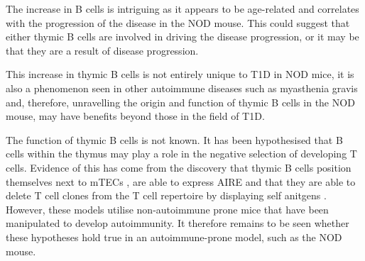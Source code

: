 


The increase in B cells is intriguing as it appears to be age-related and correlates with the progression of the disease in the NOD mouse.
This could suggest that either thymic B cells are involved in driving the disease progression, or it may be that they are a result of disease progression.

This increase in thymic B cells is not entirely unique to T1D in NOD mice, it is also a phenomenon seen in other autoimmune diseases such as myasthenia gravis \citep{Vrolix2014, Christensson1988} and, therefore, unravelling the origin and function of thymic B cells in the NOD mouse, may have benefits beyond those in the field of T1D.

The function of thymic B cells is not known.
It has been hypothesised that B cells within the thymus may play a role in the negative selection of developing T cells.
Evidence of this has come from the discovery that thymic B cells position themselves next to mTECs \citep{Perera2013}, are able to express AIRE \citep{Yamano2015} and that they are able to delete T cell clones from the T cell repertoire by displaying self anitgens \citep{Frommer2010}.
However, these models utilise non-autoimmune prone mice that have been manipulated to develop autoimmunity. 
It therefore remains to be seen whether these hypotheses hold true in an autoimmune-prone model, such as the NOD mouse.

